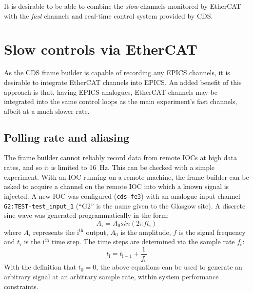 It is desirable to be able to combine the \emph{slow} channels monitored by EtherCAT with the \emph{fast} channels and real-time control system provided by \gls{CDS}.

\section{Slow controls via EtherCAT}
As the \gls{CDS} frame builder is capable of recording any \gls{EPICS} channels, it is desirable to integrate EtherCAT channels into \gls{EPICS}. An added benefit of this approach is that, having \gls{EPICS} analogues, EtherCAT channels may be integrated into the same control loops as the main experiment's fast channels, albeit at a much slower rate.

\subsection{Polling rate and aliasing}
The frame builder cannot reliably record data from remote \gls{IOC}s at high data rates, and so it is limited to \SI{16}{\hertz}. This can be checked with a simple experiment. With an \gls{IOC} running on a remote machine, the frame builder can be asked to acquire a channel on the remote \gls{IOC} into which a known signal is injected. A new \gls{IOC} was configured (\lstinline{cds-fe3}) with an analogue input channel \lstinline{G2:TEST-test_input_1} (``G2'' is the name given to the Glasgow site). A discrete sine wave was generated programmatically in the form:
\begin{equation}
  \label{eq:programmatic-sine}
  A_{i} = A_0 sin \left( 2 \pi f t_{i} \right)
\end{equation}
where $A_{i}$ represents the $\text{i}^{\text{th}}$ output, $A_0$ is the amplitude, $f$ is the signal frequency and $t_{i}$ is the $\text{i}^{\text{th}}$ time step. The time steps are determined via the sample rate $f_{\text{s}}$:
\begin{equation}
  \label{eq:programmatic-time-step}
  t_{\text{i}} = t_{\text{i}-1} + \frac{1}{f_{\text{s}}}
\end{equation}
With the definition that $t_{0} = 0$, the above equations can be used to generate an arbitrary signal at an arbitrary sample rate, within system performance constraints.

